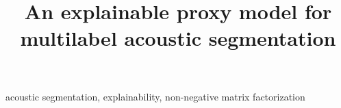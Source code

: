 \documentclass{article}
\title{An explainable proxy model for multilabel acoustic segmentation}
\begin{document}
\ninept

\maketitle
%
\begin{abstract}
\end{abstract}
%
\begin{keywords}
acoustic segmentation, explainability, non-negative matrix factorization
\end{keywords}
%







\newpage


%
\end{document}
